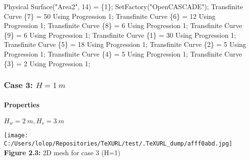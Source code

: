\documentclass[11pt]{article}
\newenvironment{Shaded}{}{}
\newcommand{\DecValTok}[1]{\textcolor[rgb]{0.25,0.63,0.44}{{#1}}}
\newcommand{\StringTok}[1]{\textcolor[rgb]{0.25,0.44,0.63}{{#1}}}
\newcommand{\NormalTok}[1]{{#1}}
\newcommand{\OperatorTok}[1]{\textcolor[rgb]{0.40,0.40,0.40}{{#1}}}
\begin{document}
\begin{Shaded}
\begin{Highlighting}[]
\NormalTok{Physical Surface}\OperatorTok{(}\StringTok{"Area2"}\OperatorTok{,} \DecValTok{14}\OperatorTok{)} \OperatorTok{=} \OperatorTok{\{}\DecValTok{1}\OperatorTok{\};}
\NormalTok{SetFactory}\OperatorTok{(}\StringTok{"OpenCASCADE"}\OperatorTok{);}
\NormalTok{Transfinite Curve }\OperatorTok{\{}\DecValTok{7}\OperatorTok{\}} \OperatorTok{=} \DecValTok{50}\NormalTok{ Using Progression }\DecValTok{1}\OperatorTok{;}
\NormalTok{Transfinite Curve }\OperatorTok{\{}\DecValTok{6}\OperatorTok{\}} \OperatorTok{=} \DecValTok{12}\NormalTok{ Using Progression }\DecValTok{1}\OperatorTok{;}
\NormalTok{Transfinite Curve }\OperatorTok{\{}\DecValTok{8}\OperatorTok{\}} \OperatorTok{=} \DecValTok{6}\NormalTok{ Using Progression }\DecValTok{1}\OperatorTok{;}
\NormalTok{Transfinite Curve }\OperatorTok{\{}\DecValTok{9}\OperatorTok{\}} \OperatorTok{=} \DecValTok{6}\NormalTok{ Using Progression }\DecValTok{1}\OperatorTok{;}
\NormalTok{Transfinite Curve }\OperatorTok{\{}\DecValTok{1}\OperatorTok{\}} \OperatorTok{=} \DecValTok{30}\NormalTok{ Using Progression }\DecValTok{1}\OperatorTok{;}
\NormalTok{Transfinite Curve }\OperatorTok{\{}\DecValTok{5}\OperatorTok{\}} \OperatorTok{=} \DecValTok{18}\NormalTok{ Using Progression }\DecValTok{1}\OperatorTok{;}
\NormalTok{Transfinite Curve }\OperatorTok{\{}\DecValTok{2}\OperatorTok{\}} \OperatorTok{=} \DecValTok{5}\NormalTok{ Using Progression }\DecValTok{1}\OperatorTok{;}
\NormalTok{Transfinite Curve }\OperatorTok{\{}\DecValTok{4}\OperatorTok{\}} \OperatorTok{=} \DecValTok{5}\NormalTok{ Using Progression }\DecValTok{1}\OperatorTok{;}
\NormalTok{Transfinite Curve }\OperatorTok{\{}\DecValTok{3}\OperatorTok{\}} \OperatorTok{=} \DecValTok{2}\NormalTok{ Using Progression }\DecValTok{1}\OperatorTok{;}
\end{Highlighting}
\end{Shaded}

\hypertarget{case-3-h-1-m}{%
\subsubsection{\texorpdfstring{Case 3:
\(H = 1\ m\)}{Case 3: H = 1\textbackslash{} m}}\label{case-3-h-1-m}}

\hypertarget{properties-3}{%
\paragraph{Properties}\label{properties-3}}

\(H_w = 2\ m, H_s = 3\ m\)

\texttt{[image: C:/Users/lolop/Repositories/TeXURL/test/.TeXURL\_dump/afff0abd.jpg]} \textbf{Figure 2.3:}
2D mesh for case 3 (H=1)
\end{document}
